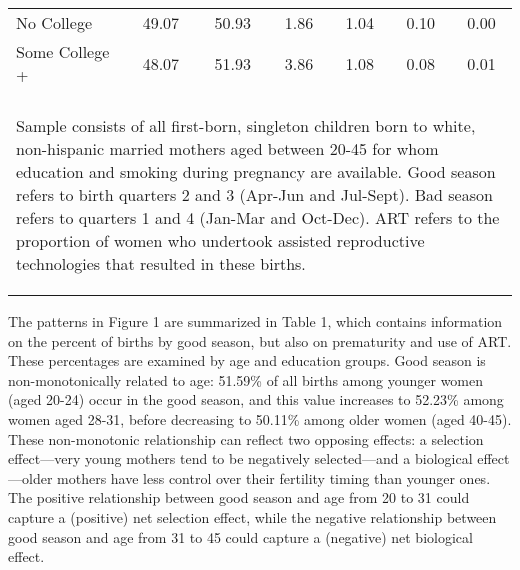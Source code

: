 \documentclass[a4paper, 11.5 pt]{article}
\theoremstyle{plain}
\begin{document}
\begin{doublespace}
\begin{table}[htpb!]
\begin{center}
\begin{tabular}{lcccccc}
No College&49.07&50.93&1.86&1.04&0.10&0.00
\\
Some College +&48.07&51.93&3.86&1.08&0.08&0.01
\\
 &&&&&& \\
\midrule\multicolumn{7}{p{11.4cm}}{\begin{footnotesize}Sample consists of all first-born, singleton children born to white, non-hispanic married mothers aged between 20-45 for whom     education and smoking during pregnancy are available. Good season refers to birth quarters 2 and 3 (Apr-Jun and Jul-Sept).  Bad season refers to quarters 1 and 4 (Jan-Mar and Oct-Dec). ART refers to the proportion of  women who undertook assisted reproductive technologies that resulted in these births.
\end{footnotesize}} \\ \bottomrule
 \end{tabular}\end{center}\end{table}


The patterns in Figure 1 are summarized in Table 1, which contains information on the percent of births by good season, but also on prematurity and use of ART. These percentages are examined by age and education groups. Good season is non-monotonically related to age: 51.59\% of all births among younger women (aged 20-24) occur in the good season, and this value increases to 52.23\% among women aged 28-31, before decreasing to 50.11\% among older women (aged 40-45). These non-monotonic relationship can reflect two opposing effects: a selection effect---very young mothers tend to be negatively selected---and a biological effect---older mothers have less control over their fertility timing than younger ones. The positive relationship between good season and age from 20 to 31 could capture a (positive) net selection effect, while the negative relationship between good season and age from 31 to 45 could capture a (negative) net biological effect.%


\end{doublespace}
\end{document}
